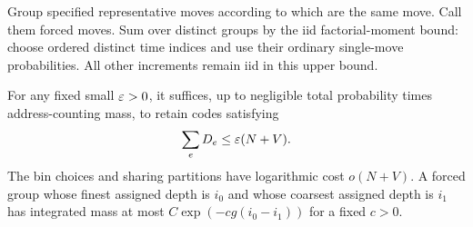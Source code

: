 Group specified representative moves according to which are the same
move.  Call them forced moves.  Sum over distinct groups by the iid
factorial-moment bound: choose ordered distinct time indices and use
their ordinary single-move probabilities.  All other increments remain
iid in this upper bound.

\begin{lemma}\label{addr:erasure-bins}
For any fixed small $\varepsilon>0$, it suffices, up to negligible total
probability times address-counting mass, to retain codes satisfying
\begin{equation}\label{eq:original-21}
                             \sum_eD_e\le\varepsilon(N+V).
\end{equation}
The bin choices and sharing partitions have logarithmic cost
$o(N+V)$.  A forced group whose finest assigned depth is $i_0$
and whose coarsest assigned depth is $i_1$ has integrated mass at
most $C\exp(-cg(i_0-i_1))$ for a fixed $c>0$.
\end{lemma}

